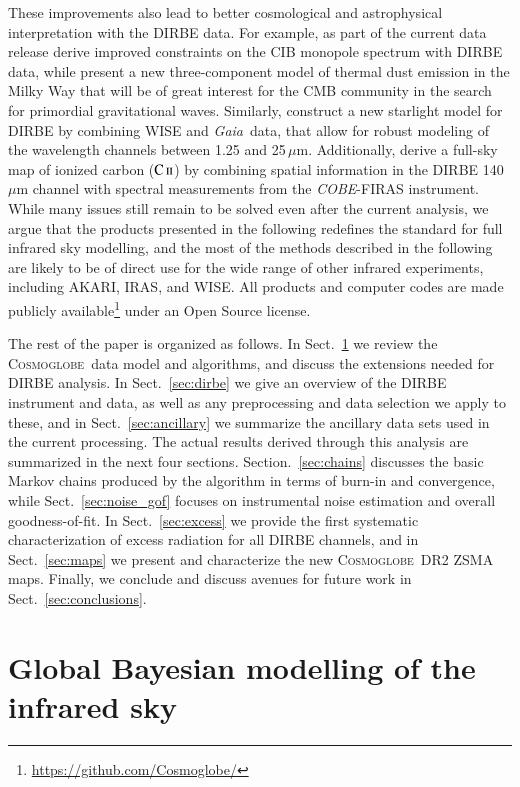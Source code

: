 \documentclass{aa}
\def\COBE{\textit{COBE}}
\def\GAIA{\textit{Gaia}}
\def\AKARI{\textrm{{AKARI}}}
\def\IRAS{\textrm{{IRAS}}}
\newcommand{\CII}{\ensuremath{\textsc{C\,ii}}}
\newcommand{\cosmoglobe}{\textsc{Cosmoglobe}}
\begin{document}
These improvements also lead to better cosmological and astrophysical interpretation with the DIRBE data. For example, as part of the current data release \citet{CG02_03} derive improved constraints on the CIB monopole spectrum with DIRBE data, while \citet{CG02_05} present a new three-component model of thermal dust emission in the Milky Way that will be of great interest for the CMB community in the search for primordial gravitational waves. Similarly, \citet{CG02_04} construct a new starlight model for DIRBE by combining WISE and \GAIA\ data, that allow for robust modeling of the wavelength channels between 1.25 and 25$\,\mu$m. Additionally, \citet{CG02_06} derive a full-sky map of ionized carbon (\CII) by combining spatial information in the DIRBE 140\,$\mu$m channel with spectral measurements from the \COBE-FIRAS instrument. While many issues still remain to be solved even after the current analysis, we argue that the products presented in the following redefines the standard for full infrared sky modelling, and the most of the methods described in the following are likely to be of direct use for the wide range of other infrared experiments, including \AKARI, \IRAS, and WISE. All products and computer codes are made publicly available\footnote{\url{https://github.com/Cosmoglobe/}} under an Open Source license.

The rest of the paper is organized as follows. In Sect.~\ref{sec:global_modelling} we review the \cosmoglobe\ data model and algorithms, and discuss the extensions needed for DIRBE analysis. In Sect.~\ref{sec:dirbe} we give an overview of the DIRBE instrument and data, as well as any preprocessing and data selection we apply to these, and in Sect.~\ref{sec:ancillary} we summarize the ancillary data sets used in the current processing. The actual results derived through this analysis are summarized in the next four sections. Section.~\ref{sec:chains} discusses the basic Markov chains produced by the algorithm in terms of burn-in and convergence, while Sect.~\ref{sec:noise_gof} focuses on instrumental noise estimation and overall goodness-of-fit. In Sect.~\ref{sec:excess} we provide the first systematic characterization of excess radiation for all DIRBE channels, and in Sect.~\ref{sec:maps} we present and characterize the new \cosmoglobe\ DR2 ZSMA maps. Finally, we conclude and discuss avenues for future work in Sect.~\ref{sec:conclusions}. 

\section{Global Bayesian modelling of the infrared sky}
\label{sec:global_modelling}
\end{document}
